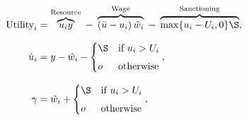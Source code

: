 \documentclass[10pt]{article}
\begin{document}
\begin{align*}
\text{Utility}_i &= \overbrace{u_i y}^{\text{Resource}} \;-\; \overbrace{(\bar{u}-u_i)\,\tilde{w}_i}^{\text{Wage}} \;-\; \overbrace{\max\{u_i - U_i,0\} \S}^{\text{Sanctioning}}, \\[6pt] 
\dot{u}_i &= y - \tilde{w}_i -\begin{cases} \S & \text{if } u_i>U_i \\[4pt] o & \text{otherwise} \end{cases}, \\[6pt]
 \gamma &= \tilde{w}_i + \begin{cases} \S & \text{if } u_i>U_i \\[4pt] o & \text{otherwise} \end{cases}, \\[6pt]\end{align*}
\end{document}

